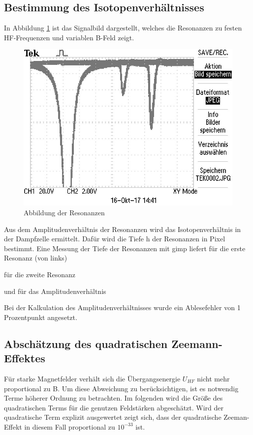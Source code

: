 \subsection{Bestimmung des Isotopenverhältnisses}
In Abbildung \ref{resonanz} ist das Signalbild dargestellt, welches die Resonanzen zu festen
HF-Frequenzen und variablen B-Feld zeigt.

\begin{figure}[h]
\centering
\includegraphics[scale=0.8]{img/TEK0002.JPG}
\caption{Abbildung der Resonanzen}
\label{resonanz}
\end{figure}


Aus dem Amplitudenverhältnis der Resonanzen wird das Isotopenverhältnis in der
Dampfzelle ermittelt. Dafür wird die Tiefe h der Resonanzen in Pixel bestimmt.
Eine Messung der Tiefe der Resonanzen mit gimp liefert für die erste Resonanz (von links)



für die zweite Resonanz



und für das Amplitudenverhältnis



Bei der Kalkulation des Amplitudenverhältnisses wurde ein Ablesefehler von 1 Prozentpunkt
angesetzt.

\subsection{Abschätzung des quadratischen Zeemann-Effektes}
Für starke Magnetfelder verhält sich die Übergangsenergie $U_{HF}$ nicht mehr proportional zu B. Um diese Abweichung zu berücksichtigen, ist es notwendig Terme höherer Ordnung zu betrachten.
Im folgenden wird die Größe des quadratischen Terms für die genutzen Feldstärken abgeschätzt. Wird der quadratische Term explizit ausgewertet zeigt sich, dass der quadratische Zeeman-Effekt in diesem Fall proportional zu $10^{-33}$ ist.

